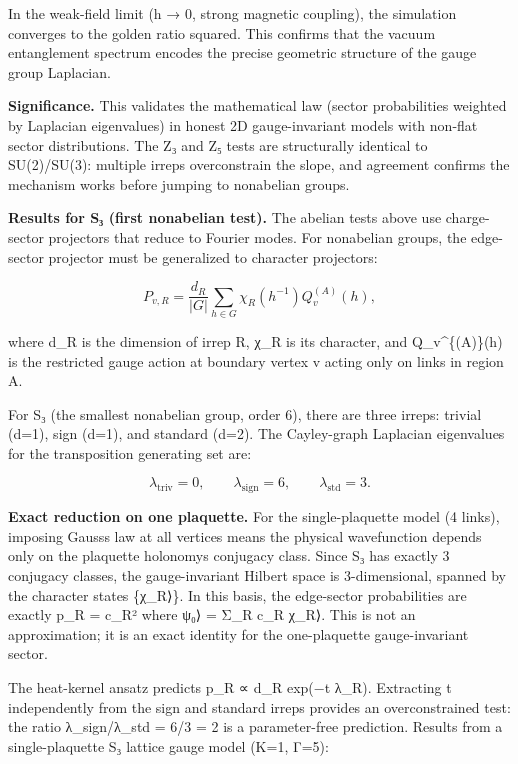 In the weak-field limit (h → 0, strong magnetic coupling), the simulation converges to the golden ratio squared. This confirms that the vacuum entanglement spectrum encodes the precise geometric structure of the gauge group Laplacian.

\textbf{Significance.} This validates the mathematical law (sector probabilities weighted by Laplacian eigenvalues) in honest 2D gauge-invariant models with non-flat sector distributions. The Z₃ and Z₅ tests are structurally identical to SU(2)/SU(3): multiple irreps overconstrain the slope, and agreement confirms the mechanism works before jumping to nonabelian groups.

\textbf{Results for S₃ (first nonabelian test).} The abelian tests above use charge-sector projectors that reduce to Fourier modes. For nonabelian groups, the edge-sector projector must be generalized to character projectors:

\[
P_{v,R} = \frac{d_R}{|G|} \sum_{h \in G} \chi_R(h^{-1}) Q_v^{(A)}(h),
\]

where d\_R is the dimension of irrep R, χ\_R is its character, and Q\_v\^{}\{(A)\}(h) is the restricted gauge action at boundary vertex v acting only on links in region A.

For S₃ (the smallest nonabelian group, order 6), there are three irreps: trivial (d=1), sign (d=1), and standard (d=2). The Cayley-graph Laplacian eigenvalues for the transposition generating set are:

\[
\lambda_{\mathrm{triv}} = 0, \qquad \lambda_{\mathrm{sign}} = 6, \qquad
\lambda_{\mathrm{std}} = 3.
\]

\textbf{Exact reduction on one plaquette.} For the single-plaquette model (4 links), imposing Gauss\textquotesingle s law at all vertices means the physical wavefunction depends only on the plaquette holonomy\textquotesingle s conjugacy class. Since S₃ has exactly 3 conjugacy classes, the gauge-invariant Hilbert space is 3-dimensional, spanned by the character states \{\textbar χ\_R⟩\}. In this basis, the edge-sector probabilities are exactly p\_R = \textbar c\_R\textbar² where \textbar ψ₀⟩ = Σ\_R c\_R \textbar χ\_R⟩. This is not an approximation; it is an exact identity for the one-plaquette gauge-invariant sector.

The heat-kernel ansatz predicts p\_R ∝ d\_R exp(−t λ\_R). Extracting t independently from the sign and standard irreps provides an overconstrained test: the ratio λ\_sign/λ\_std = 6/3 = 2 is a parameter-free prediction. Results from a single-plaquette S₃ lattice gauge model (K=1, Γ=5):

